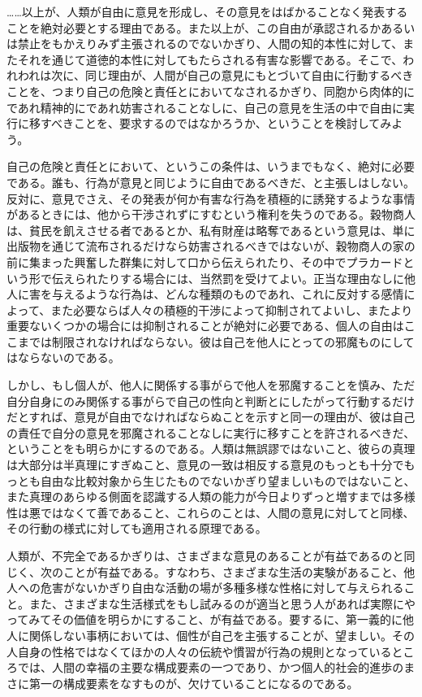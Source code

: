 ……以上が、人類が自由に意見を形成し、その意見をはばかることなく発表することを絶対必要とする理由である。また以上が、この自由が承認されるかあるいは禁止をもかえりみず主張されるのでないかぎり、人間の知的本性に対して、またそれを通じて道徳的本性に対してもたらされる有害な影響である。そこで、われわれは次に、同じ理由が、人間が自己の意見にもとづいて自由に行動するべきことを、つまり自己の危険と責任とにおいてなされるかぎり、同胞から肉体的にであれ精神的にであれ妨害されることなしに、自己の意見を生活の中で自由に実行に移すべきことを、要求するのではなかろうか、ということを検討してみよう。



自己の危険と責任とにおいて、というこの条件は、いうまでもなく、絶対に必要である。誰も、行為が意見と同じように自由であるべきだ、と主張しはしない。反対に、意見でさえ、その発表が何か有害な行為を積極的に誘発するような事情があるときには、他から干渉されずにすむという権利を失うのである。穀物商人は、貧民を飢えさせる者であるとか、私有財産は略奪であるという意見は、単に出版物を通じて流布されるだけなら妨害されるべきではないが、穀物商人の家の前に集まった興奮した群集に対して口から伝えられたり、その中でプラカードという形で伝えられたりする場合には、当然罰を受けてよい。正当な理由なしに他人に害を与えるような行為は、どんな種類のものであれ、これに反対する感情によって、また必要ならば人々の積極的干渉によって抑制されてよいし、またより重要ないくつかの場合には抑制されることが絶対に必要である、個人の自由はここまでは制限されなければならない。彼は自己を他人にとっての邪魔ものにしてはならないのである。


しかし、もし個人が、他人に関係する事がらで他人を邪魔することを慎み、ただ自分自身にのみ関係する事がらで自己の性向と判断とにしたがって行動するだけだとすれば、意見が自由でなければならぬことを示すと同一の理由が、彼は自己の責任で自分の意見を邪魔されることなしに実行に移すことを許されるべきだ、ということをも明らかにするのである。人類は無誤謬ではないこと、彼らの真理は大部分は半真理にすぎぬこと、意見の一致は相反する意見のもっとも十分でもっとも自由な比較対象から生じたものでないかぎり望ましいものではないこと、また真理のあらゆる側面を認識する人類の能力が今日よりずっと増すまでは多様性は悪ではなくて善であること、これらのことは、人間の意見に対してと同様、その行動の様式に対しても適用される原理である。


人類が、不完全であるかぎりは、さまざまな意見のあることが有益であるのと同じく、次のことが有益である。すなわち、さまざまな生活の実験があること、他人への危害がないかぎり自由な活動の場が多種多様な性格に対して与えられること。また、さまざまな生活様式をもし試みるのが適当と思う人があれば実際にやってみてその価値を明らかにすること、が有益である。要するに、第一義的に他人に関係しない事柄においては、個性が自己を主張することが、望ましい。その人自身の性格ではなくてほかの人々の伝統や慣習が行為の規則となっているところでは、人間の幸福の主要な構成要素の一つであり、かつ個人的社会的進歩のまさに第一の構成要素をなすものが、欠けていることになるのである。



